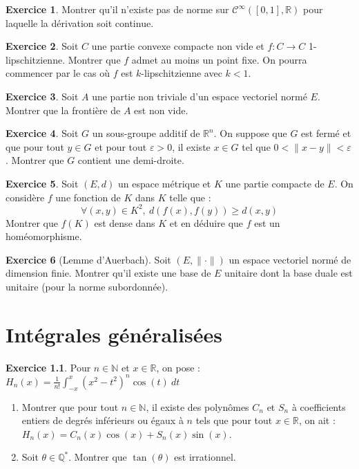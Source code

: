 \documentclass[french]{book}
\newcommand{\N}{\mathbb{N}}
\newcommand{\Q}{\mathbb{Q}}
\newcommand{\R}{\mathbb{R}}
\newcommand{\st}{^*}
\theoremstyle{definition}
\newtheorem{ex}{Exercice}[chapter]
\begin{document}
\begin{ex}
	Montrer qu'il n'existe pas de norme sur $\mathcal{C}^{\infty}([0,1],\R)$ pour laquelle la dérivation soit continue.
\end{ex}

\begin{ex}
	Soit $C$ une partie convexe compacte non vide et $f:C\to C$ 1-lipschitzienne. Montrer que $f$ admet au moins un point fixe. On pourra commencer par le cas où $f$ est $k$-lipschitzienne avec $k<1$.
\end{ex}

\begin{ex}
	Soit $A$ une partie non triviale d'un espace vectoriel normé $E$. Montrer que la frontière de $A$ est non vide.
\end{ex}

\begin{ex}
	Soit $G$ un sous-groupe additif de $\R^n$. On suppose que $G$ est fermé et que pour tout $y\in G$ et pour tout $\varepsilon>0$, il existe $x\in G$ tel que $0<\lVert x-y\rVert<\varepsilon$. Montrer que $G$ contient une demi-droite.
\end{ex}

\begin{ex}
	Soit $(E,d)$ un espace métrique et $K$ une partie compacte de $E$. On considère $f$ une fonction de $K$ dans $K$ telle que : $$\forall (x,y)\in K^2,\ d(f(x),f(y))\geqslant d(x,y)$$
	Montrer que $f(K)$ est dense dans $K$ et en déduire que $f$ est un homéomorphisme.
\end{ex}

\begin{ex}[Lemme d'Auerbach]
	Soit $(E,\lVert\cdot\rVert)$ un espace vectoriel normé de dimension finie. Montrer qu'il existe une base de $E$ unitaire dont la base duale est unitaire (pour la norme subordonnée).
\end{ex}

\chapter{Intégrales généralisées}

\begin{ex}
	Pour $n\in\N$ et $x\in\R$, on pose : $H_n(x)=\displaystyle\frac{1}{n!}\int_{-x}^{x}(x^2-t^2)^n\cos(t)\ dt$
	\begin{enumerate}
		\item Montrer que pour tout $n\in\N$, il existe des polynômes $C_n$ et $S_n$ à coefficients entiers de degrés inférieurs ou égaux à $n$ tels que pour tout $x\in\R$, on ait : $H_n(x)=C_n(x)\cos(x)+S_n(x)\sin(x)$.
		\item Soit $\theta\in\Q\st$. Montrer que $\tan(\theta)$ est irrationnel.
	\end{enumerate}
\end{ex}
\end{document}
